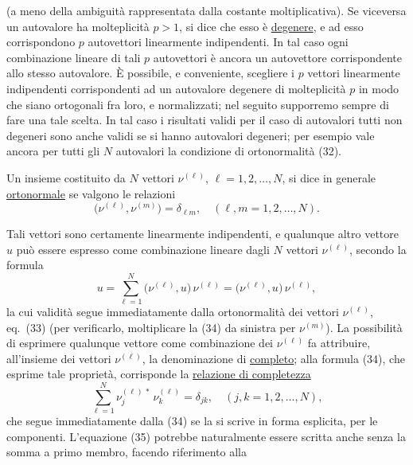 \documentclass[11pt, a4paper]{book}
\numberwithin{equation}{section}
\begin{document}

(a meno della ambiguità rappresentata dalla costante moltiplicativa). Se
viceversa un autovalore ha molteplicità $p > 1$, si dice che esso è
\underline{degenere}, e ad esso corrispondono $p$ autovettori linearmente
indipendenti. In tal caso ogni combinazione lineare di tali $p$ autovettori
è ancora un autovettore corrispondente allo stesso autovalore. È possibile,
e conveniente, scegliere i $p$ vettori linearmente indipendenti
corrispondenti ad un autovalore degenere di molteplicità $p$ in modo che
siano ortogonali fra loro, e normalizzati; nel seguito supporremo sempre di
fare una tale scelta. In tal caso i risultati validi per il caso di
autovalori tutti non degeneri sono anche validi se si hanno autovalori
degeneri; per esempio vale ancora per tutti gli $N$ autovalori la
condizione di ortonormalità (32).

Un insieme costituito da $N$ vettori $\nu^{(\ell)}$, $\ell=1,2,\ldots,N$,
si dice in generale \underline{ortonormale} se valgono le relazioni
\begin{equation}
\bigl(\nu^{(\ell)}, \nu^{(m)}\bigr) = \delta_{\ell m},
\quad (\ell, m = 1, 2, \ldots, N).
\end{equation}

Tali vettori sono certamente linearmente indipendenti, e qualunque altro
vettore $u$ può essere espresso come combinazione lineare dagli $N$
vettori $\nu^{(\ell)}$, secondo la formula
\begin{equation}
u = \sum_{\ell=1}^{N} \bigl(\nu^{(\ell)}, u\bigr)\,\nu^{(\ell)}
  = \bigl(\nu^{(\ell)}, u\bigr)\,\nu^{(\ell)},
\end{equation}
la cui validità segue immediatamente dalla ortonormalità dei vettori
$\nu^{(\ell)}$, eq.\ (33) (per verificarlo, moltiplicare la (34) da
sinistra per $\nu^{(m)}$). La possibilità di esprimere qualunque vettore
come combinazione dei $\nu^{(\ell)}$ fa attribuire, all'insieme dei vettori
$\nu^{(\ell)}$, la denominazione di \underline{completo}; alla formula
(34), che esprime tale proprietà, corrisponde la \underline{relazione di
completezza}
\begin{equation}
\sum_{\ell=1}^{N} \nu_j^{(\ell)\,*}\,\nu_k^{(\ell)} = \delta_{jk},
\quad (j,k = 1,2,\ldots,N),
\end{equation}
che segue immediatamente dalla (34) se la si scrive in forma esplicita,
per le componenti. L'equazione (35) potrebbe naturalmente essere scritta
anche senza la somma a primo membro, facendo riferimento alla
\end{document}

